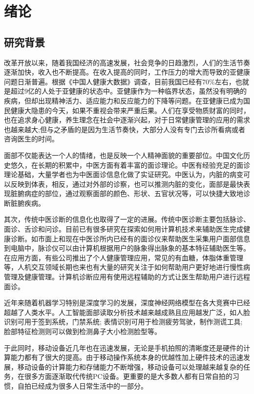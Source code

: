 \chapter{绪论}

\section{研究背景}
改革开放以来，随着我国经济的高速发展，社会竞争的日趋激烈，人们的生活节奏逐渐加快，收入也不断提高。在收入提高的同时，工作压力的增大而导致的亚健康问题日渐普遍。根据《中国人健康大数据》调查，目前我国已经有70\%左右，也就是超过9亿的人处于亚健康的状态中。亚健康作为一种临界状态，虽然没有明确的疾病，但却出现精神活力、适应能力和反应能力的下降等问题。在亚健康已成为国民健康大隐患的今天，如果不重视会带来严重后果。人们在享受物质财富的同时，也在追求身心健康，养生理念在社会中逐渐兴起，对于日常健康管理的应用的需求也越来越大;但与之矛盾的是因为生活节奏快，大部分人没有专门去诊所看病或者咨询医生的时间。

面部不仅能表达一个人的情绪，也是反映一个人精神面貌的重要部位。中国文化历史悠久，在长期的积累中，中医方面有着丰富的面诊理论。中医有经验充足的面诊理论基础，大量学者也为中医面诊信息化做了实证研究。中医认为，内脏的病变可以反映到体表，相反，通过对外部的诊察，也可以推测内脏的变化，面部是最快表现脏腑病症的部位，通过观察面部的颜色、形状、五官状况等，可以快捷大致地诊断脏腑疾病。

其次，传统中医诊断的信息化也取得了一定的进展。传统中医诊断主要包括脉诊、面诊、舌诊和问诊。目前已有很多研究在探索如何用计算机技术来辅助医生完成健康诊断。如市面上和现在中医诊所内已经有的面诊仪来帮助医生采集用户面部信息到电脑中，脉诊仪可以由计算机根据用户的脉象得出脉象的基本特征辅助医生等\cite{Zhang2018Study2}。在应用方面，有些公司推出了个人健康管理应用，常见的有血糖，体脂体重管理等，人机交互领域长期也来也有大量的研究关注于如何帮助用户更好地进行慢性病管理及健康管理。计算机诊断应用有使用远程辅助的方式让医生帮助用户进行远程面诊。

近年来随着机器学习特别是深度学习的发展，深度神经网络模型在各大竞赛中已经超越了人类水平。人工智能面部读取分析技术越来越成熟且应用越发广泛，如人脸识别可用于签到系统，门禁系统; 表情识别可用于检测疲劳驾驶，制作测谎工具; 脸部特征检测则可以做到检测鼻子大小检测脸型等。

于此同时，移动设备近几年也在迅速发展，无论是手机拍照的清晰度还是硬件的计算能力都有了很大的提高。由于移动操作系统本身的优越性加上硬件技术的迅速发展，移动设备的计算能力和存储能力不断增强，移动设备可以处理越来越复杂的任务，在很多方面逐渐取代传统PC设备。更重要的是大多数人都有日常自拍的习惯，自拍已经成为很多人日常生活中的一部分。

